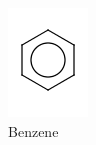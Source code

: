 \begin{figure}[H]
\begin{subfigure}[b]{.14\textwidth}
\includegraphics[width=\textwidth]{figures_c3/BENZENE.png}
\caption{Benzene}
\end{subfigure}
\begin{subfigure}[b]{.14\textwidth}

\end{subfigure}
\end{figure}
